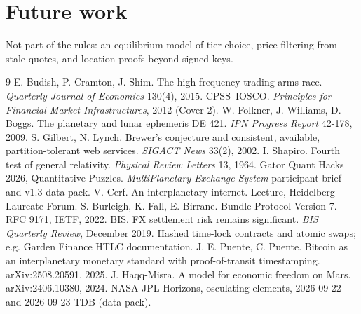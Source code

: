 \section{Future work}\label{sec:future}
Not part of the rules: an equilibrium model of tier choice, price filtering from stale quotes, and location proofs beyond signed keys.

\begin{thebibliography}{9}\small
{} E. Budish, P. Cramton, J. Shim. The high-frequency trading arms race. \emph{Quarterly Journal of Economics} 130(4), 2015.
 CPSS--IOSCO. \emph{Principles for Financial Market Infrastructures}, 2012 (Cover 2).
 W. Folkner, J. Williams, D. Boggs. The planetary and lunar ephemeris DE 421. \emph{IPN Progress Report} 42-178, 2009.
 S. Gilbert, N. Lynch. Brewer's conjecture and consistent, available, partition-tolerant web services. \emph{SIGACT News} 33(2), 2002.
 I. Shapiro. Fourth test of general relativity. \emph{Physical Review Letters} 13, 1964.
 Gator Quant Hacks 2026, Quantitative Puzzles. \emph{MultiPlanetary Exchange System} participant brief and v1.3 data pack.
 V. Cerf. An interplanetary internet. Lecture, Heidelberg Laureate Forum.
 S. Burleigh, K. Fall, E. Birrane. Bundle Protocol Version 7. RFC 9171, IETF, 2022.
 BIS. FX settlement risk remains significant. \emph{BIS Quarterly Review}, December 2019.
 Hashed time-lock contracts and atomic swaps; e.g. Garden Finance HTLC documentation.
 J. E. Puente, C. Puente. Bitcoin as an interplanetary monetary standard with proof-of-transit timestamping. arXiv:2508.20591, 2025.
 J. Haqq-Misra. A model for economic freedom on Mars. arXiv:2406.10380, 2024.
 NASA JPL Horizons, osculating elements, 2026-09-22 and 2026-09-23 TDB (data pack).
\end{thebibliography}
